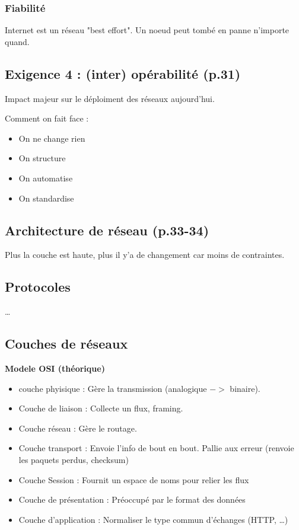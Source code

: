 \documentclass[12pt]{article}
\begin{document}
\subsubsection*{Fiabilité}

Internet est un réseau "best effort". Un noeud peut tombé en panne n'importe quand.

\subsection*{Exigence 4 : (inter) opérabilité (p.31)}
Impact majeur sur le déploiment des réseaux aujourd'hui.

Comment on fait face : 
\begin{itemize}
    \item On ne change rien
    \item On structure
    \item On automatise
    \item On standardise
\end{itemize}

\subsection*{Architecture de réseau (p.33-34)}

Plus la couche est haute, plus il y'a de changement car moins de contraintes.

\subsection*{Protocoles}
\dots

\subsection*{Couches de réseaux}

\textbf{Modele OSI (théorique)}
\begin{itemize}
    \item couche phyisique : Gère la transmission (analogique $->$ binaire).
    \item Couche de liaison : Collecte un flux, framing.
    \item Couche réseau : Gère le routage.
    \item Couche transport : Envoie l'info de bout en bout. Pallie aux erreur (renvoie les paquets perdus, checksum)
    \item Couche Session : Fournit un espace de noms pour relier les flux
    \item Couche de présentation : Préoccupé par le format des données
    \item Couche d'application : Normaliser le type commun d'échanges (HTTP, \dots)
\end{itemize}
\end{document}
